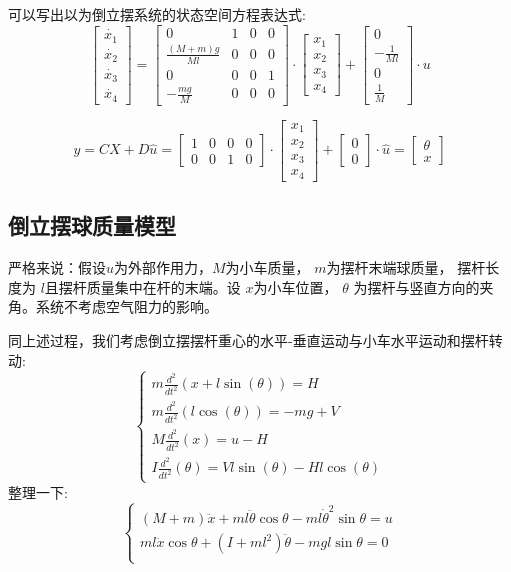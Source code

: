 \documentclass{article}
\begin{document}
可以写出以为倒立摆系统的状态空间方程表达式:
\[
\begin{bmatrix}
\dot{x_1}\\\dot{x_2}\\\dot{x_3}\\\dot{x_4}    
\end{bmatrix}
=
\begin{bmatrix}
0&1&0&0\\
\frac{(M+m)g}{Ml}&0&0&0\\
0&0&0&1\\
-\frac{mg}{M}&0&0&0
\end{bmatrix}\cdot
\begin{bmatrix}
    x_1\\x_2\\x_3\\x_4
\end{bmatrix} + 
\begin{bmatrix}
0\\
-\frac{1}{Ml}\\
0\\
\frac{1}{M}
\end{bmatrix}\cdot u 
\]

\[
y=CX+D\hat{u}=\begin{bmatrix}
    1&0&0&0\\
    0&0&1&0
\end{bmatrix} \cdot
\begin{bmatrix}
    x_1\\x_2\\x_3\\x_4
\end{bmatrix}+\begin{bmatrix}
    0\\0
\end{bmatrix}\cdot \hat{u}=
\begin{bmatrix}
   \theta \\ x
\end{bmatrix}
\]

\subsection*{倒立摆球质量模型}
严格来说：假设$u$为外部作用力，$M$为小车质量， $m$为摆杆末端球质量，
摆杆长度为 $l$且摆杆质量集中在杆的末端。设 $x$为小车位置， 
$ \theta$ 为摆杆与竖直方向的夹角。系统不考虑空气阻力的影响。

同上述过程，我们考虑倒立摆摆杆重心的水平-垂直运动与小车水平运动和摆杆转动:
\[
\left\{\begin{matrix}
    m\frac{d^2}{dt^2}(x+l\sin(\theta)) = H \\
    m\frac{d^2}{dt^2}(l\cos(\theta)) = -mg + V \\
    M\frac{d^2}{dt^2}(x) = u - H \\
    I\frac{d^2}{dt^2}(\theta) = Vl\sin(\theta) - Hl\cos(\theta)
\end{matrix}\right.
\]
整理一下:
\[\left\{\begin{matrix}
    (M+m)\ddot{x}+ml\ddot{\theta}\cos\theta -ml\dot{\theta}^2\sin\theta = u \\
    ml\ddot{x}\cos\theta+(I+ml^2)\ddot{\theta}-mgl\sin\theta = 0 \\
\end{matrix}
\right.\]
\end{document}
